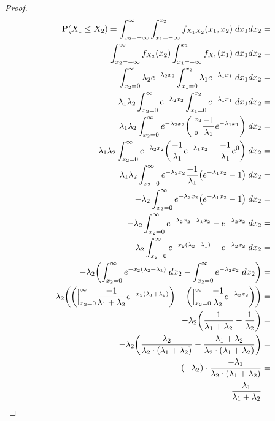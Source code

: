 \begin{proof}
    \begin{align*} 
        \mathrm{P}(X_1 \leq X_2) = \int_{x_2 = -\infty}^{\infty} \int_{x_1 = -\infty}^{x_2} f_{X_{1}X_{2}}(x_1, x_2) \; dx_{1}dx_{2} &= \\ 
        \int_{x_2 = -\infty}^{\infty} f_{X_{2}}(x_2) \int_{x_1 = -\infty}^{x_2} f_{X_1}(x_1) \; dx_{1}dx_{2} &=  \\
        \int_{x_2 = 0}^{\infty} \lambda_2 e^{-\lambda_{2}x_2} \int_{x_1 = 0}^{x_2} \lambda_1 e^{-\lambda_1 x_1} \; dx_{1}dx_{2} &= \\
        \lambda_1 \lambda_2 \int_{x_2 = 0}^{\infty} e^{-\lambda_{2}x_2} \int_{x_1 = 0}^{x_2} e^{-\lambda_1 x_1} \; dx_{1}dx_{2} &= \\ 
        \lambda_1 \lambda_2 \int_{x_2 = 0}^{\infty} e^{-\lambda_{2}x_2} \pars{\Big\rvert_{0}^{x_2} \frac{-1}{\lambda_1} e^{-\lambda_1 x_1} } \;  dx_{2} &= \\ 
        \lambda_1 \lambda_2 \int_{x_2 = 0}^{\infty} e^{-\lambda_{2}x_2} \pars{\frac{-1}{\lambda_1} e^{-\lambda_1 x_2} - \frac{-1}{\lambda_1} e^0} \; dx_2 &= \\ 
        \lambda_1 \lambda_2 \int_{x_2 = 0}^{\infty} e^{-\lambda_2 x_2} \frac{-1}{\lambda_1} \pars{e^{-\lambda_1 x_2} - 1} \; dx_2 &= \\ 
        -\lambda_2 \int_{x_2=0}^{\infty} e^{-\lambda_2 x_2} \pars{e^{-\lambda_1 x_2} - 1} \; dx_2 &= \\ 
        -\lambda_2 \int_{x_2=0}^{\infty} e^{-\lambda_2x_2 - \lambda_1 x_2} - e^{-\lambda_2 x_2} \; dx_2 &= \\ 
         -\lambda_2 \int_{x_2=0}^{\infty} e^{-x_2\pars{\lambda_2 + \lambda_1}} - e^{-\lambda_2 x_2} \; dx_2 &= \\ 
        -\lambda_2 \pars{\int_{x_2=0}^{\infty} e^{-x_2\pars{\lambda_2 + \lambda_1}} \; dx_2 - \int_{x_2=0}^{\infty} e^{-\lambda_2 x_2} \; dx_2} &= \\
        -\lambda_2 \pars{\pars{\Big\rvert_{x_2=0}^{\infty} \frac{-1}{\lambda_1 + \lambda_2} e^{-x_2(\lambda_1 + \lambda_2)}} - \pars{\Big\rvert_{x_2=0}^{\infty} \frac{-1}{\lambda_2} e^{-\lambda_2 x_2}}} &= \\ 
        -\lambda_2 \pars{\frac{1}{\lambda_1 + \lambda_2} - \frac{1}{\lambda_2}} &= \\ 
        -\lambda_2 \pars{\frac{\lambda_2}{\lambda_2 \cdot \pars{\lambda_1 + \lambda_2}} - \frac{\lambda_1 + \lambda_2}{\lambda_2 \cdot \pars{\lambda_1 + \lambda_2}}} &= \\
        (-\lambda_2)\cdot \frac{-\lambda_1}{\lambda_2 \cdot \pars{\lambda_1 + \lambda_2}} &= \\ 
        \frac{\lambda_1}{\lambda_1 + \lambda_2}
    \end{align*}
\end{proof}


